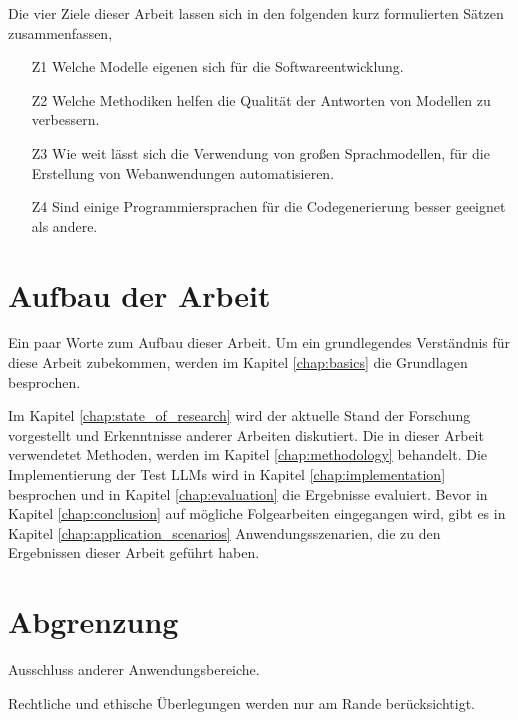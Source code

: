 Die vier Ziele dieser Arbeit lassen sich in den folgenden kurz formulierten Sätzen zusammenfassen,

\begin{itemize}
	\item[Z1] Welche Modelle eigenen sich für die Softwareentwicklung.
	\item[Z2] Welche Methodiken helfen die Qualität der Antworten von Modellen zu verbessern.
	\item[Z3] Wie weit lässt sich die Verwendung von großen Sprachmodellen, für die Erstellung von Webanwendungen automatisieren.
	\item[Z4] Sind einige Programmiersprachen für die Codegenerierung besser geeignet als andere.
\end{itemize}


\section{Aufbau der Arbeit}
Ein paar Worte zum Aufbau dieser Arbeit. Um ein grundlegendes Verständnis für diese Arbeit zubekommen, werden im Kapitel \ref{chap:basics} die Grundlagen besprochen.\vspace{0.2cm}

Im Kapitel \ref{chap:state_of_research} wird der aktuelle Stand der Forschung vorgestellt und Erkenntnisse anderer Arbeiten diskutiert. Die in dieser Arbeit verwendetet Methoden, werden im Kapitel \ref{chap:methodology} behandelt. Die Implementierung der Test LLMs wird in Kapitel \ref{chap:implementation} besprochen und in Kapitel \ref{chap:evaluation} die Ergebnisse evaluiert. Bevor in Kapitel \ref{chap:conclusion} auf mögliche Folgearbeiten eingegangen wird, gibt es in Kapitel \ref{chap:application_scenarios} Anwendungsszenarien, die zu den Ergebnissen dieser Arbeit geführt haben.


\section{Abgrenzung}
Ausschluss anderer Anwendungsbereiche.

Rechtliche und ethische Überlegungen werden nur am Rande berücksichtigt.